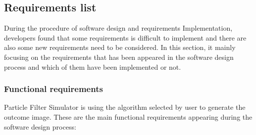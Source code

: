 \documentclass[11pt,oneside,a4paper]{article}
\begin{document}
\subsection{Requirements list}
During the procedure of software design and requirements Implementation, developers found that some requirements is difficult to implement and there are also some new requirements need to be considered. In this section, it mainly focusing on the requirements that has been appeared in the software design process and which of them have been implemented or not.
\subsubsection{Functional requirements}
Particle Filter Simulator is using the algorithm selected by user to generate the outcome image. These are the main functional requirements appearing during the software design process:
\end{document}
